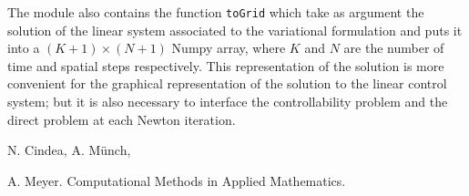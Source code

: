 \documentclass{amsart}
\theoremstyle{plain}
\theoremstyle{definition}
\theoremstyle{remark}
\numberwithin{equation}{section}
\begin{document}
The module also contains the function \verb|toGrid| which take as argument the solution of the 
linear  system associated to the variational formulation and puts it into a $(K+1)\times (N+1)$ Numpy
array, where $K$ and $N$ are the number of time and spatial steps respectively. 
This representation of the solution is more convenient for the graphical representation of 
the solution to the linear control system; but it is also necessary to interface the 
controllability problem and the direct problem at each Newton iteration.


\begin{thebibliography}{99}


 N. Cindea, A. M\"unch, 

 A. Meyer.  {Computational Methods in Applied Mathematics.}


\end{thebibliography}
\end{document}
